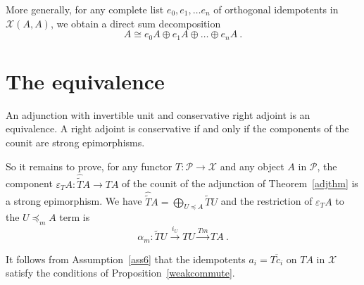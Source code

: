 \documentclass[a4paper,12pt,reqno]{amsart}
\theoremstyle{definition}
\theoremstyle{fact}
\theoremstyle{genquest}
\theoremstyle{step}
\newcommand{\lra}{\longrightarrow}
\newcommand{\ra}{\rightarrow}
\def\CP{{\mathscr P}}
\def\CX{{\mathscr X}}
\begin{document}
More generally, for any complete list $e_0, e_1, \dots e_n$ of orthogonal idempotents
in $\CX (A,A)$, we obtain a direct sum decomposition
$$A\cong e_0A \oplus e_1A \oplus \dots \oplus e_nA \ .$$ 

\section{The equivalence}\label{equivalence}

An adjunction with invertible unit and conservative right adjoint is an equivalence.
A right adjoint is conservative if and only if the components of the counit are strong epimorphisms. 

So it remains to prove, for any functor $T: \CP \ra \CX$ and
any object $A$ in $\CP$, the component 
$\varepsilon_TA : \widehat{\widetilde{T}}A \ra TA$ of the counit
of the adjunction of Theorem~\ref{adjthm} is a strong epimorphism.
We have $\widehat{\widetilde{T}}A = \bigoplus_{U\preceq A}{\widetilde{T}U}$
and the restriction of $\varepsilon_TA$ to the $U\preceq_m A$ term is  
\begin{equation}\label{alph}
\alpha_m : \widetilde{T}U \stackrel{i_U}\lra TU \stackrel{Tm} \lra TA \ . 
\end{equation}

It follows from Assumption~\ref{ass6} that the idempotents 
$a_i = \overline{Tc_i}$ on $TA$ in $\CX$ 
satisfy the conditions of Proposition~\ref{weakcommute}.
\end{document}
